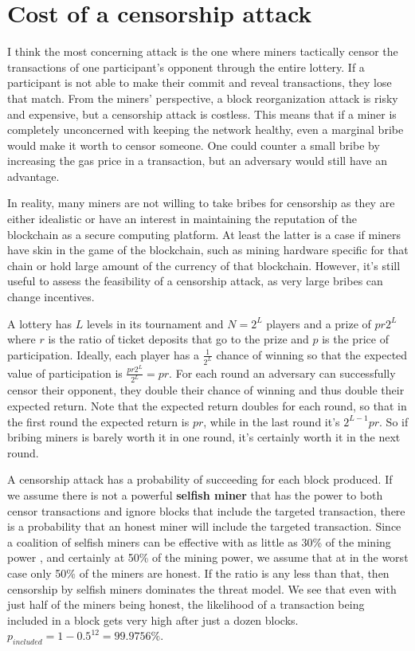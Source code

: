 \section{Cost of a censorship attack}
\label{sec:censorship}

I think the most concerning attack is the one where miners tactically censor the transactions of one participant's opponent through the entire lottery. If a participant is not able to make their commit and reveal transactions, they lose that match. From the miners' perspective, a block reorganization attack is risky and expensive, but a censorship attack is costless. This means that if a miner is completely unconcerned with keeping the network healthy, even a marginal bribe would make it worth to censor someone. One could counter a small bribe by increasing the gas price in a transaction, but an adversary would still have an advantage. 

In reality, many miners are not willing to take bribes for censorship as they are either idealistic or have an interest in maintaining the reputation of the blockchain as a secure computing platform. At least the latter is a case if miners have skin in the game of the blockchain, such as mining hardware specific for that chain or hold large amount of the currency of that blockchain. However, it's still useful to assess the feasibility of a censorship attack, as very large bribes can change incentives. 

A lottery has $L$ levels in its tournament and $N=2^L$ players and a prize of $pr2^L$ where $r$ is the ratio of ticket deposits that go to the prize and $p$ is the price of participation. Ideally, each player has a $\frac{1}{2^L}$ chance of winning so that the expected value of participation is $\frac{pr2^L}{2^L}=pr$. For each round an adversary can successfully censor their opponent, they double their chance of winning and thus double their expected return. Note that the expected return doubles for each round, so that in the first round the expected return is $pr$, while in the last round it's $2^{L-1}pr$. So if bribing miners is barely worth it in one round, it's certainly worth it in the next round.

A censorship attack has a probability of succeeding for each block produced. If we assume there is not a powerful \textbf{selfish miner} that has the power to both censor transactions and ignore blocks that include the targeted transaction, there is a probability that an honest miner will include the targeted transaction. Since a coalition of selfish miners can be effective with as little as 30\% of the mining power \cite{eyal_majority_2018}, and certainly at 50\% of the mining power, we assume that at in the worst case only 50\% of the miners are honest. If the ratio is any less than that, then censorship by selfish miners dominates the threat model. We see that even with just half of the miners being honest, the likelihood of a transaction being included in a block gets very high after just a dozen blocks. $p_{included} = 1-0.5^{12}=99.9756\%$.

